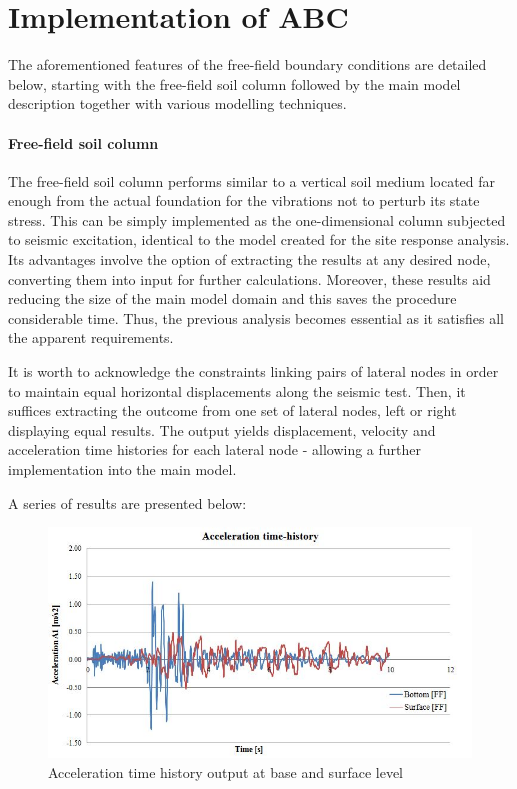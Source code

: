 \section{Implementation of ABC} \label{implemenent}
The aforementioned features of the free-field boundary conditions are detailed below, starting with the free-field soil column followed by the main model description together with various modelling techniques. 
	\paragraph{Free-field soil column}
	The free-field soil column performs similar to a vertical soil medium located far enough from the actual foundation for the vibrations not to perturb its state stress. This can be simply implemented as the one-dimensional column subjected to seismic excitation, identical to the model created for the site response analysis. Its advantages involve the option of extracting the results at any desired node, converting them into input for further calculations. Moreover, these results aid reducing the size of the main model domain and this saves the procedure considerable time. Thus, the previous analysis becomes essential as it satisfies all the apparent requirements. 
	
	It is worth to acknowledge the constraints linking pairs of lateral nodes in order to maintain equal horizontal displacements along the seismic test. Then, it suffices extracting the outcome from one set of lateral nodes, left or right displaying equal results. The output yields displacement, velocity and acceleration time histories for each lateral node - allowing a further implementation into the main model.
	
	A series of results are presented below:
		\begin{figure}[h!]
			\centering
			\includegraphics[width=0.7\linewidth]{"acc_FF"}
			\caption{Acceleration time history output at base and surface level}
			\label{Acc_ff}
		\end{figure} 
		

